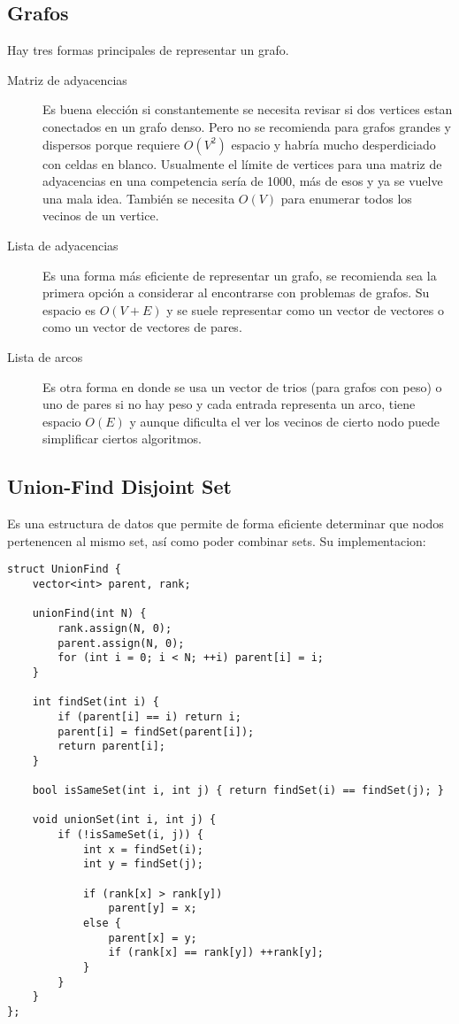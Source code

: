 \documentclass[10pt]{article}
\begin{document}
\subsection{Grafos}

Hay tres formas principales de representar un grafo.

\begin{description}
    \item[Matriz de adyacencias] Es buena elección si constantemente se necesita revisar si dos vertices estan conectados en un grafo denso. Pero no se recomienda para grafos grandes y dispersos porque requiere $O(V^2)$ espacio y habría mucho desperdiciado con celdas en blanco. Usualmente el límite de vertices para una matriz de adyacencias en una competencia sería de 1000, más de esos y ya se vuelve una mala idea. También se necesita $O(V)$ para enumerar todos los vecinos de un vertice.
    \item[Lista de adyacencias] Es una forma más eficiente de representar un grafo, se recomienda sea la primera opción a considerar al encontrarse con problemas de grafos. Su espacio es $O(V + E)$ y se suele representar como un vector de vectores o como un vector de vectores de pares.
    \item[Lista de arcos] Es otra forma en donde se usa un vector de trios (para grafos con peso) o uno de pares si no hay peso y cada entrada representa un arco, tiene espacio $O(E)$ y aunque dificulta el ver los vecinos de cierto nodo puede simplificar ciertos algoritmos.
\end{description}

\subsection{Union-Find Disjoint Set}

Es una estructura de datos que permite de forma eficiente determinar que nodos pertenencen al mismo set, así como poder combinar sets. Su implementacion:

\begin{lstlisting}
struct UnionFind {
    vector<int> parent, rank;

    unionFind(int N) {
        rank.assign(N, 0);
        parent.assign(N, 0);
        for (int i = 0; i < N; ++i) parent[i] = i;
    }

    int findSet(int i) {
        if (parent[i] == i) return i;
        parent[i] = findSet(parent[i]);
        return parent[i];
    }

    bool isSameSet(int i, int j) { return findSet(i) == findSet(j); }

    void unionSet(int i, int j) {
        if (!isSameSet(i, j)) {
            int x = findSet(i);
            int y = findSet(j);

            if (rank[x] > rank[y])
                parent[y] = x;
            else {
                parent[x] = y;
                if (rank[x] == rank[y]) ++rank[y];
            }
        }
    }
};
\end{lstlisting}
\end{document}
